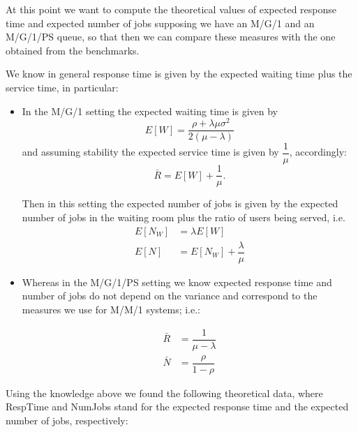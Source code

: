 \documentclass[11pt]{scrartcl} %
\begin{document}
At this point we want to compute the theoretical values of expected response time and expected number of jobs supposing we have an M/G/1 and an M/G/1/PS queue, so that then we can compare these measures with the one obtained from the benchmarks.

We know in general  response time  is given by the expected waiting time plus the service time, in particular: 
\begin{itemize}
\item[\adforn{43}] In the M/G/1 setting the expected waiting  time is given by $$E[W]=\dfrac{\rho+\lambda\mu\sigma^2}{2(\mu-\lambda)}$$ and assuming stability  the expected service time is given by $\dfrac{1}{\mu}$, accordingly:
$$\bar{R}=E[W]+\dfrac{1}{\mu} .$$

Then in this setting the expected number of jobs is given by the expected number of jobs in the waiting room plus the ratio of users being served, i.e.
\begin{align*}
E[N_W] &= \lambda E[W]\\
E[N] &= E[N_W]+\dfrac{\lambda}{\mu}
\end{align*}

\item[\adforn{43}] Whereas in the M/G/1/PS setting we know expected response time and number of jobs do not depend on the variance and correspond to the measures we use for M/M/1 systems; i.e.:

\begin{align*}
\bar{R} &= \dfrac{1}{\mu-\lambda}\\
\bar{N} &= \dfrac{\rho}{1-\rho}
\end{align*}
\end{itemize}

Using the knowledge above we found the following theoretical data, where RespTime and NumJobs stand for the expected response time and the expected number of jobs, respectively:
\end{document}

